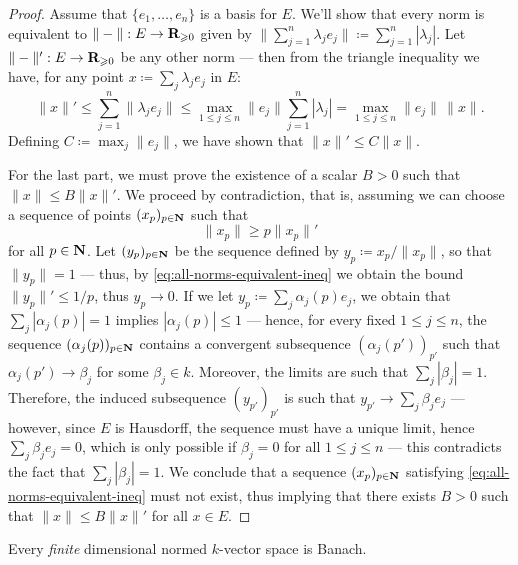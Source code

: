 \begin{proof}
    Assume that \(\{e_1, \dots, e_n\}\) is a basis for \(E\). We'll show that every
    norm is equivalent to \(\| - \|: E \to \mathbf{R}_{\geqslant 0}\) given by \(\| \sum_{j=1}^n
    \lambda_j e_j \| \coloneq \sum_{j=1}^n |\lambda_j|\). Let \(\| - \|': E \to
    \mathbf{R}_{\geqslant 0}\) be any other norm --- then from the triangle inequality we have,
    for any point \(x \coloneq \sum_j \lambda_j e_j\) in \(E\):
    \[
        \| x \|'
        \leq \sum_{j=1}^n \| \lambda_j e_j \|
        \leq \max_{1 \leq j \leq n} \| e_j \| \sum_{j=1}^n |\lambda_j|
        = \max_{1 \leq j \leq n} \| e_j \|\, \| x \|.
    \]
    Defining \(C \coloneq \max_j \| e_j \|\), we have shown that \(\| x \|' \leq C
    \| x \|\).

    For the last part, we must prove the existence of a scalar \(B > 0\) such that
    \(\| x \| \leq B \| x \|'\). We proceed by contradiction, that is, assuming we
    can choose a sequence of points \((x_p)_{p \in \mathbf{N}}\) such that
    \begin{equation}\label{eq:all-norms-equivalent-ineq}
        \| x_p \| \geq p \| x_p \|'
    \end{equation}
    for all \(p \in \mathbf{N}\). Let \((y_p)_{p \in \mathbf{N}}\) be the sequence defined by \(y_p
    \coloneq x_p/\| x_p \|\), so that \(\| y_p \| = 1\) --- thus, by
    \cref{eq:all-norms-equivalent-ineq} we obtain the bound \(\| y_p \|' \leq 1/p\),
    thus \(y_p \to 0\). If we let \(y_p \coloneq \sum_j \alpha_j(p) e_j\), we obtain
    that \(\sum_j |\alpha_j(p)| = 1\) implies \(|\alpha_j(p)| \leq 1\) --- hence,
    for every fixed \(1 \leq j \leq n\), the sequence \((\alpha_j(p))_{p \in \mathbf{N}}\)
    contains a convergent subsequence \((\alpha_j(p'))_{p'}\) such that
    \(\alpha_{j}(p') \to \beta_j\) for some \(\beta_j \in k\). Moreover, the limits
    are such that \(\sum_j |\beta_j| = 1\). Therefore, the induced subsequence
    \((y_{p'})_{p'}\) is such that \(y_{p'} \to \sum_j \beta_j e_j\) --- however,
    since \(E\) is Hausdorff, the sequence must have a unique limit, hence \(\sum_j
    \beta_j e_j = 0\), which is only possible if \(\beta_j = 0\) for all \(1 \leq j
    \leq n\) --- this contradicts the fact that \(\sum_j |\beta_j| = 1\). We
    conclude that a sequence \((x_p)_{p \in \mathbf{N}}\) satisfying
    \cref{eq:all-norms-equivalent-ineq} must not exist, thus implying that there
    exists \(B > 0\) such that \(\| x \| \leq B \| x \|'\) for all \(x \in E\).
\end{proof}

\begin{corollary}
    \label{cor:finite-dimensional-is-banach}
    Every \emph{finite} dimensional normed \(k\)-vector space is Banach.
\end{corollary}

